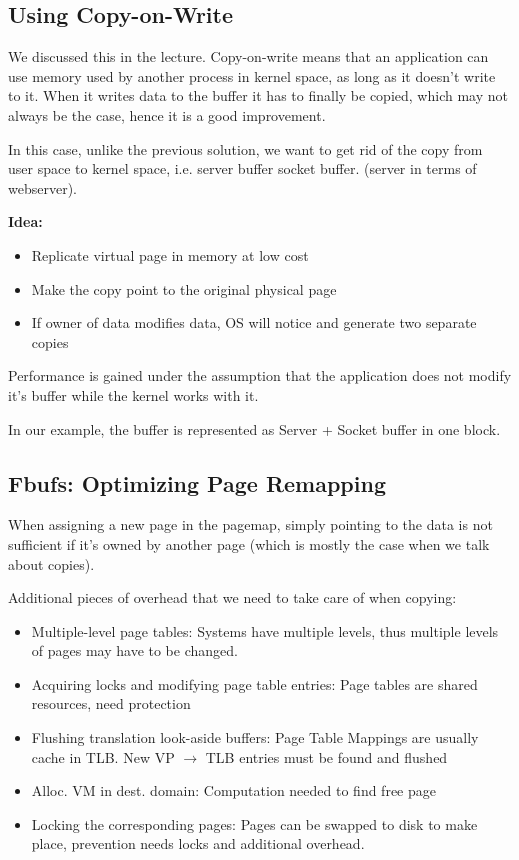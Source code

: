 \subsection{Using Copy-on-Write}

We discussed this in the lecture. Copy-on-write means that an application can use memory used by another process in kernel space, as long as it doesn't write to it. When it writes data to the buffer it has to finally be copied, which may not always be the case, hence it is a good improvement.

In this case, unlike the previous solution, we want to get rid of the copy from user space to kernel space, i.e. server buffer socket buffer. (server in terms of webserver). 

\textbf{Idea:}

\begin{itemize}
    \item Replicate virtual page in memory at low cost
    \item Make the copy point to the original physical page
    \item If owner of data modifies data, OS will notice and generate two separate copies
\end{itemize}

Performance is gained under the assumption that the application does not modify it's buffer while the kernel works with it.

In our example, the buffer is represented as Server + Socket buffer in one block.

\subsection{Fbufs: Optimizing Page Remapping}

When assigning a new page in the pagemap, simply pointing to the data is not sufficient if it's owned by another page (which is mostly the case when we talk about copies).

Additional pieces of overhead that we need to take care of when copying:

\begin{itemize}
    \item Multiple-level page tables: Systems have multiple levels, thus multiple levels of pages may have to be changed.
    \item Acquiring locks and modifying page table entries: Page tables are shared resources, need protection
    \item Flushing translation look-aside buffers: Page Table Mappings are usually cache in TLB. New VP $\rightarrow$ TLB entries must be found and flushed
    \item Alloc. VM in dest. domain: Computation needed to find free page
    \item Locking the corresponding pages: Pages can be swapped to disk to make place, prevention needs locks and additional overhead.
\end{itemize}

